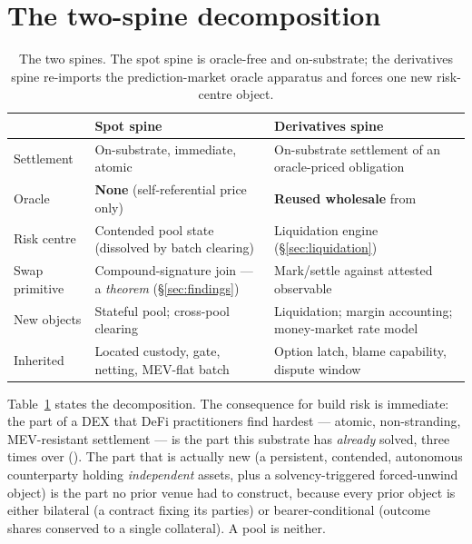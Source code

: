 \documentclass[11pt]{article}
\theoremstyle{definition}
\begin{document}
\section{The two-spine decomposition}\label{sec:spines}

\begin{table}[t]
\centering
\footnotesize
\setlength{\tabcolsep}{4pt}
\begin{tabular}{@{}p{}p{}p{}@{}}
\toprule
& \textbf{Spot spine} & \textbf{Derivatives spine} \\
\midrule
Settlement & On-substrate, immediate, atomic & On-substrate settlement of an oracle-priced obligation \\
Oracle & \textbf{None} (self-referential price only) & \textbf{Reused wholesale} from \cite[\S4]{predmkt} \\
Risk centre & Contended pool state (dissolved by batch clearing) & Liquidation engine (\S\ref{sec:liquidation}) \\
Swap primitive & Compound-signature join --- a \emph{theorem} (\S\ref{sec:findings}) & Mark/settle against attested observable \\
New objects & Stateful pool; cross-pool clearing & Liquidation; margin accounting; money-market rate model \\
Inherited & Located custody, gate, netting, MEV-flat batch & Option latch, blame capability, dispute window \\
\bottomrule
\end{tabular}
\caption{The two spines. The spot spine is oracle-free and on-substrate; the derivatives spine
re-imports the prediction-market oracle apparatus and forces one new risk-centre object.}
\label{tab:spines}
\end{table}

Table~\ref{tab:spines} states the decomposition. The consequence for build risk is immediate: the
part of a DEX that DeFi practitioners find hardest --- atomic, non-stranding, MEV-resistant
settlement --- is the part this substrate has \emph{already} solved, three times over
(\cite{finrho,ppf,predmkt}). The part that is actually new (a persistent, contended, autonomous
counterparty holding \emph{independent} assets, plus a solvency-triggered forced-unwind object) is
the part no prior venue had to construct, because every prior object is either bilateral (a contract
fixing its parties) or bearer-conditional (outcome shares conserved to a single collateral). A pool
is neither.
\end{document}
